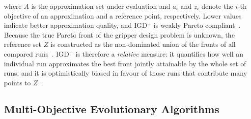 where $A$ is the approximation set under evaluation and  $a_i$ and $z_i$ denote the $i$-th objective of an approximation and a reference point,
respectively. Lower values indicate better approximation quality, and IGD$^+$ is weakly Pareto compliant~\cite{Ishibuchi2015Modified}. Because the true
Pareto front of the gripper design problem is unknown, the reference set $Z$ is constructed as the non-dominated union of the fronts of all compared
runs~\cite{Cai2020A}. IGD$^+$ is therefore a \emph{relative} measure: it quantifies how well an individual run approximates the best front jointly attainable by the
whole set of runs, and it is optimistically biased in favour of those runs that contribute many points to $Z$~\cite{Cai2020A}.




\subsection{Multi-Objective Evolutionary Algorithms}
\label{subsec:moea}

